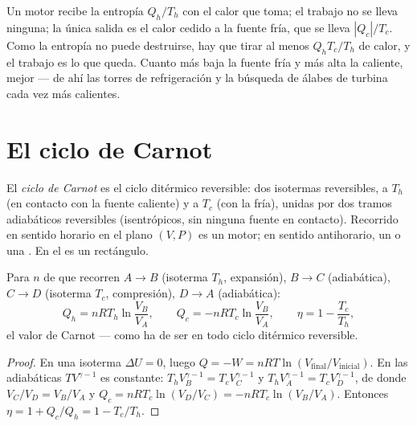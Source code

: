 \begin{remark}\label{rem:b1:heat-engines:why}
Un motor recibe la entropía $Q_h/T_h$ con el calor que toma; el trabajo no
se lleva ninguna; la única salida es el calor cedido a la fuente fría, que
se lleva $|Q_c|/T_c$. Como la entropía no puede destruirse, hay que tirar
al menos $Q_h T_c/T_h$ de calor, y el trabajo es lo que queda. Cuanto más
baja la fuente fría y más alta la caliente, mejor --- de ahí las torres de
refrigeración y la búsqueda de álabes de turbina cada vez más calientes.
\end{remark}

\section{El ciclo de Carnot}

\begin{definition}\label{def:b1:heat-engines:carnotcycle}
El \emph{ciclo de Carnot} es el ciclo ditérmico reversible: dos isotermas
reversibles, a $T_h$ (en contacto con la fuente caliente) y a $T_c$ (con la
fría), unidas por dos tramos adiabáticos reversibles (isentrópicos, sin
ninguna fuente en contacto). Recorrido en sentido horario en el plano
$(V, P)$ es un motor; en sentido antihorario, un  o una . En el  es un rectángulo.
\end{definition}

\begin{proposition}\label{prop:b1:heat-engines:carnotgas}
Para $n$  de  que recorren $A \to B$ (isoterma $T_h$,
expansión), $B \to C$ (adiabática), $C \to D$ (isoterma $T_c$,
compresión), $D \to A$ (adiabática):
\[
Q_h = nRT_h\ln\frac{V_B}{V_A}, \qquad
Q_c = -nRT_c\ln\frac{V_B}{V_A}, \qquad
\eta = 1 - \frac{T_c}{T_h} ,
\]
el valor de Carnot --- como ha de ser en todo ciclo ditérmico reversible.
\end{proposition}

\begin{proof}
En una isoterma $\Delta U = 0$, luego $Q = -W = nRT\ln(V_{\text{final}}/
V_{\text{inicial}})$. En las adiabáticas $TV^{\gamma-1}$ es constante:
$T_hV_B^{\gamma-1} = T_cV_C^{\gamma-1}$ y $T_hV_A^{\gamma-1} =
T_cV_D^{\gamma-1}$, de donde $V_C/V_D = V_B/V_A$ y $Q_c = nRT_c\ln(V_D/V_C) =
-nRT_c\ln(V_B/V_A)$. Entonces $\eta = 1 + Q_c/Q_h = 1 - T_c/T_h$.
\end{proof}


